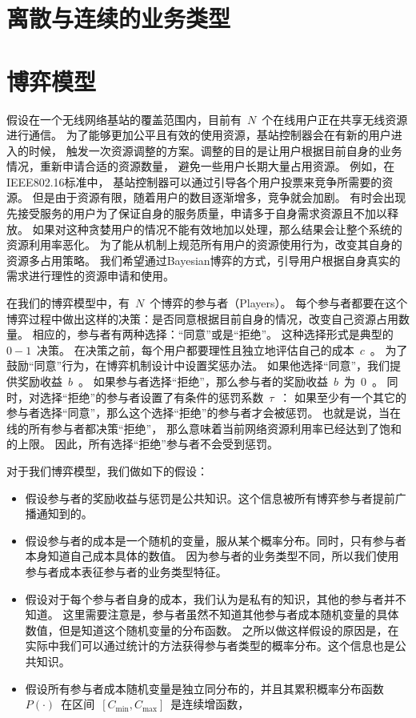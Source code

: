 \section{离散与连续的业务类型}
\section{博弈模型}
假设在一个无线网络基站的覆盖范围内，目前有~$N$~个在线用户正在共享无线资源进行通信。
为了能够更加公平且有效的使用资源，基站控制器会在有新的用户进入的时候，
触发一次资源调整的方案。调整的目的是让用户根据目前自身的业务情况，重新申请合适的资源数量，
避免一些用户长期大量占用资源。
例如，在IEEE802.16标准中，
基站控制器可以通过引导各个用户投票来竞争所需要的资源。
但是由于资源有限，随着用户的数目逐渐增多，竞争就会加剧。
有时会出现先接受服务的用户为了保证自身的服务质量，申请多于自身需求资源且不加以释放。
如果对这种贪婪用户的情况不能有效地加以处理，那么结果会让整个系统的资源利用率恶化。
为了能从机制上规范所有用户的资源使用行为，改变其自身的资源多占用策略。
我们希望通过Bayesian博弈的方式，引导用户根据自身真实的需求进行理性的资源申请和使用。

在我们的博弈模型中，有~$N$~个博弈的参与者（Players）。
每个参与者都要在这个博弈过程中做出这样的决策：是否同意根据目前自身的情况，改变自己资源占用数量。
相应的，参与者有两种选择：“同意”或是“拒绝”。
这种选择形式是典型的~$0-1$~决策。
在决策之前，每个用户都要理性且独立地评估自己的成本~$c$~。
为了鼓励“同意”行为，在博弈机制设计中设置奖惩办法。
如果他选择“同意”，我们提供奖励收益~$b$~。
如果参与者选择“拒绝”，那么参与者的奖励收益~$b$~为~$0$~。
同时，对选择“拒绝”的参与者设置了有条件的惩罚系数~$\tau$~：
如果至少有一个其它的参与者选择“同意”，那么这个选择“拒绝”的参与者才会被惩罚。
也就是说，当在线的所有参与者都决策“拒绝”，
那么意味着当前网络资源利用率已经达到了饱和的上限。
因此，所有选择“拒绝”参与者不会受到惩罚。

对于我们博弈模型，我们做如下的假设：
\begin{itemize}
    \item 假设参与者的奖励收益与惩罚是公共知识。这个信息被所有博弈参与者提前广播通知到的。
    \item 假设参与者的成本是一个随机的变量，服从某个概率分布。同时，只有参与者本身知道自己成本具体的数值。
    因为参与者的业务类型不同，所以我们使用参与者成本表征参与者的业务类型特征。
    \item 假设对于每个参与者自身的成本，我们认为是私有的知识，其他的参与者并不知道。
    这里需要注意是，参与者虽然不知道其他参与者成本随机变量的具体数值，但是知道这个随机变量的分布函数。
    之所以做这样假设的原因是，在实际中我们可以通过统计的方法获得参与者类型的概率分布。这个信息也是公共知识。
    \item 假设所有参与者成本随机变量是独立同分布的，并且其累积概率分布函数~$P(\cdot)$~在区间~$[C_{\min}, C_{\max}]$~是连续增函数，
\end{itemize}

